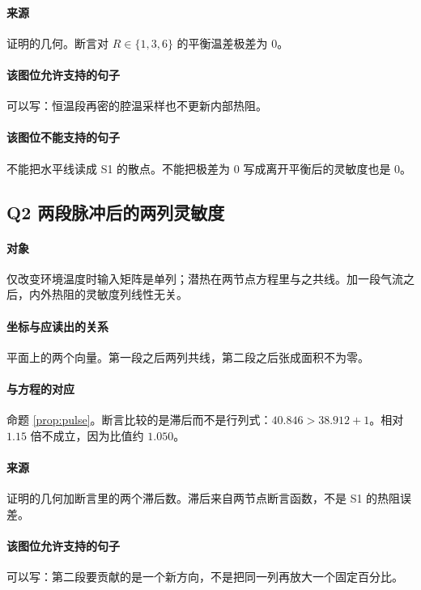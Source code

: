 \paragraph{来源}
证明的几何。断言对 $R\in\{1,3,6\}$ 的平衡温差极差为 0。

\paragraph{该图位允许支持的句子}
可以写：恒温段再密的腔温采样也不更新内部热阻。

\paragraph{该图位不能支持的句子}
不能把水平线读成 S1 的散点。不能把极差为 0 写成离开平衡后的灵敏度也是 0。

\subsection{Q2 两段脉冲后的两列灵敏度}
\paragraph{对象}
仅改变环境温度时输入矩阵是单列；潜热在两节点方程里与之共线。加一段气流之后，内外热阻的灵敏度列线性无关。

\paragraph{坐标与应读出的关系}
平面上的两个向量。第一段之后两列共线，第二段之后张成面积不为零。

\paragraph{与方程的对应}
命题 \ref{prop:pulse}。断言比较的是滞后而不是行列式：$40.846>38.912+1$。相对 $1.15$ 倍不成立，因为比值约 $1.050$。

\paragraph{来源}
证明的几何加断言里的两个滞后数。滞后来自两节点断言函数，不是 S1 的热阻误差。

\paragraph{该图位允许支持的句子}
可以写：第二段要贡献的是一个新方向，不是把同一列再放大一个固定百分比。

